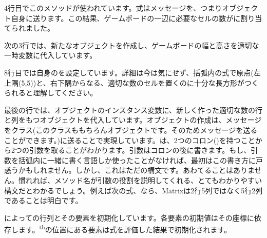 \documentclass[a4paper,10pt,twoside]{book}
\begin{document}
4行目でこのメソッドが使われています。\st 式はメッセージを、つまりオブジェクト自身に送ります。この結果、ゲームボードの一辺に必要なセルの数がに割り当てられました。

次の3行では、新たなオブジェクトを作成し、ゲームボードの幅と高さを適切な一時変数に代入しています。

8行目では自身のを設定しています。詳細は今は気にせず、括弧内の式で原点(\ie 左上隅(5,5))と、右下隅からなる、適切な数のセルを置くのに十分な長方形がつくられると理解してください。

最後の行では、オブジェクトのインスタンス変数に、新しく作った適切な数の行と列をもつオブジェクトを代入しています。オブジェクトの作成は、メッセージをクラス(このクラスももちろんオブジェクトです。そのためメッセージを送ることができます。)に送ることで実現しています。は、2つのコロン(\ct{:})を持つことから2つの引数を取ることがわかります。引数はコロンの後に書きます。もし、引数を括弧内に一緒に書く言語しか使ったことがなければ、最初はこの書き方に戸惑うかもしれません。しかし、これはただの構文です。あわてることはありません。慣れれば、メソッド名が引数の役割を説明してくれる、とてもわかりやすい構文だとわかるでしょう。例えば次の式、なら、Matrixは2行5列ではなく5行2列であることは明白です。


によっての行列とその要素を初期化しています。各要素の初期値はその座標に依存します。\textsuperscript{th}の位置にある要素は式を評価した結果で初期化されます。



\end{document}
